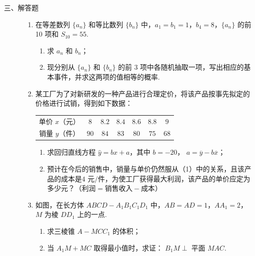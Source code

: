 \begin{description}

    \item[三、解答题]

    \begin{enumerate}[leftmargin=5pt]

      \addtocounter{enumi}{+16}

        \item 在等差数列 \(\{a_{n}\}\) 和等比数列 \(\{b_{n}\}\) 中，\(a_{1} = b_{1} = 1\)，\(b_{4} = 8\)，\(\{a_{n}\}\) 的前 10 项和 \(S_{10} = 55\).
\begin{enumerate}
\item 求 \(a_{n}\) 和 \(b_{n}\)；
\item 现分别从 \( \{a_{n}\} \) 和 \( \{b_{n}\} \) 的前 3 项中各随机抽取一项，写出相应的基本事件，并求这两项的值相等的概率.
\end{enumerate}

        \item 某工厂为了对新研发的一种产品进行合理定价，将该产品按事先拟定的价格进行试销，得到如下数据：
\begin{center}
\begin{tabular}{ccccccc}
单价 \(x\)（\(\text{元}\)） & \(8\) & \(8.2\) & \(8.4\) & \(8.6\) & \(8.8\) & \(9\) \\
销量 \(y\)（\(\text{件}\)） & \(90\) & \(84\) & \(83\) & \(80\) & \(75\) & \(68\)
\end{tabular}
\end{center}
\begin{enumerate}
\item 求回归直线方程 \( \hat{y} = bx + a \)，其中 \(b = -20\)， \( a = \overline{y} - b\overline{x} \)；
\item 预计在今后的销售中，销量与单价仍然服从（1）中的关系，且该产品的成本是\(4\text{ 元/件}\)，为使工厂获得最大利润，该产品的单价应定为多少\(\text{元}\)？（\(\text{利润}=\text{销售收入}-\text{成本}\)）
\end{enumerate}

        \item 如图，在长方体 \(ABCD - A_{1}B_{1}C_{1}D_{1}\) 中，\(AB = AD = 1\)，\(AA_{1} = 2\)，\(M\) 为棱 \(DD_{1}\) 上的一点.
\begin{enumerate}
\item 求三棱锥 \( A - MCC_{1} \) 的体积；
\item 当 \(A_{1}M + MC\) 取得最小值时，求证： \(B_{1}M \perp\) 平面 \(MAC\).
\end{enumerate}


\end{enumerate}
\end{description}
